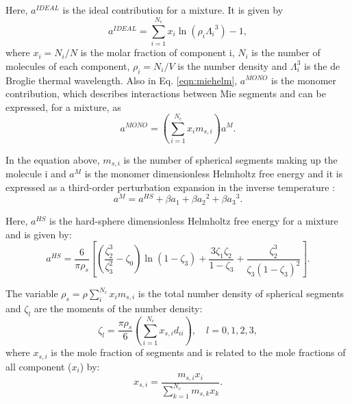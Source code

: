	Here, $a^{IDEAL}$ is the ideal contribution for a mixture. It is given by
	\begin{equation}
	a^{IDEAL} = \sum_{i=1}^{N_{c}} x_{i}\ln{(\rho_{i}{\Lambda_{i}}^3)} -1 ,
	\label{eqn:aideal}
	\end{equation}
	where $x_{i}=N_{i}/N$ is the molar fraction of component i, $N_{i}$ is the number of molecules of each component, $\rho_{i}=N_{i}/V$ is the number density and $\Lambda_{i}^3$ is the de Broglie thermal wavelength. Also in Eq. \ref{eqn:miehelm}, $a^{MONO}$ is the monomer contribution, which  describes interactions between Mie segments and can be expressed, for a mixture, as
	\begin{equation}
	a^{MONO} = \left(\sum_{i=1}^{N_{c}} x_{i}m_{s,i} \right)a^{M} .
	\label{eqn:amonomer}
	\end{equation}
	
	In the equation above, $m_{s,i}$ is the number of spherical segments making up the molecule i and $a^{M}$  is the monomer dimensionless Helmholtz free energy and it is expressed as a third-order perturbation expansion in the inverse temperature \cite{bh1976}:
	\begin{equation}
	a^{M} = a^{HS}+\beta{a_{1}}+\beta{a_{2}}^2+\beta{a_{3}}^3 . 
	\label{eqn:aM}
	\end{equation}
	
	 Here, $a^{HS}$ is the hard-sphere dimensionless Helmholtz free energy for a mixture and is given by:
	\begin{equation}
	a^{HS} = \frac{6}{\pi\rho_{s}}\left[\left(\frac{\zeta^3_2}{\zeta^2_3}-\zeta_0 \right)\ln(1-\zeta_3)+\frac{3\zeta_{1}\zeta_{2}}{1-\zeta_3}+ \frac{\zeta^3_2}{\zeta_{3}(1-\zeta_3)^2}\right] .
	\label{eqn:hs}
	\end{equation}
	
	The variable $\rho_{s}=\rho\sum_{i}^{N_c} x_{i}m_{s,i}$ is the total number density of spherical segments and $\zeta_l$ are the moments of the number density:
	\begin{equation}
	\zeta_l = \frac{\pi\rho_s}{6}\left(\sum_{i=1}^{N_c} x_{s,i}d_{ii} \right), \quad l = 0,1,2,3 ,
	\label{eqn:zetal}
	\end{equation}
	where $x_{s,i}$ is the mole fraction of segments and is related to the mole fractions of all component ($x_i$) by:
	\begin{equation}
	x_{s,i} = \frac{m_{s,i}x_i}{\sum_{k=1}^{N_c} m_{s,k}x_{k} } .
	\label{eqn:xsi}
	\end{equation}
	
